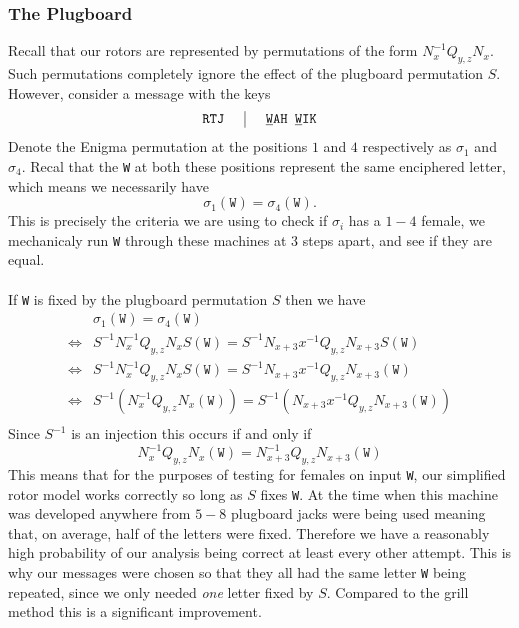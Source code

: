 \subsubsection{The Plugboard}
Recall that our rotors are represented by permutations of the form
$N_{x}^{-1}Q_{y,z}N_{x}$. Such permutations completely ignore the
effect of the plugboard permutation $S$. However, consider a message
with the keys
\[
  \setlength{\arraycolsep}{15pt}
  \begin{array}{c | c}
    \texttt{RTJ} & {\uline{\texttt{W}}}\texttt{AH
    }{\uline{\texttt{W}}}\texttt{IK} \\
  \end{array}
\]
Denote the Enigma permutation at the positions $1$ and $4$
respectively as $\sigma_1$ and $\sigma_4$. Recal that the \texttt{W}
at both these positions represent the same enciphered letter, which
means we necessarily have
\[
  \sigma_1(\texttt{W}) = \sigma_4(\texttt{W}).
\]
This is precisely the criteria we are using to check if $\sigma_i$
has a $1-4$ female, we mechanicaly run \texttt{W} through these
machines at 3 steps apart, and see if they are equal.
\\\\If \texttt{W} is fixed by the plugboard permutation $S$ then we have
\begin{align*}
  & \sigma_1(\texttt{W}) = \sigma_4(\texttt{W})
  \\
  \iff & S^{-1}N_x^{-1}Q_{y,z}N_xS(\texttt{W}) =
  S^{-1}N_{x+3}x^{-1}Q_{y,z}N_{x+3}S(\texttt{W})   \\
  \iff & S^{-1}N_x^{-1}Q_{y,z}N_xS(\texttt{W}) =
  S^{-1}N_{x+3}x^{-1}Q_{y,z}N_{x+3}(\texttt{W})    \\
  \iff & S^{-1}(N_x^{-1}Q_{y,z}N_x(\texttt{W})) =
  S^{-1}(N_{x+3}x^{-1}Q_{y,z}N_{x+3}(\texttt{W})) \\
\end{align*}
Since $S^{-1}$ is an injection this occurs if and only if
\[
  N_x^{-1}Q_{y,z}N_x(\texttt{W}) = N_{x+3}^{-1}Q_{y,z}N_{x+3}(\texttt{W})
\]
This means that for the purposes of testing for females on input
\texttt{W}, our simplified rotor model works correctly so long as $S$
fixes \texttt{W}. At the time when this machine was developed
anywhere from $5-8$ plugboard jacks were being used meaning that, on
average, half of the letters were fixed. Therefore we have a
reasonably high probability of our analysis being correct at least
every other attempt. This is why our messages were chosen so that
they all had the same letter \texttt{W} being repeated, since we only
needed \emph{one} letter fixed by $S$. Compared to the grill method
this is a significant improvement.

